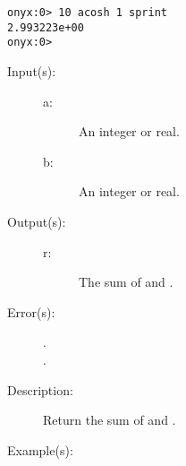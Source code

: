 \begin{description}
\begin{description}
\begin{verbatim}
onyx:0> 10 acosh 1 sprint
2.993223e+00
onyx:0>
		\end{verbatim}
	\end{description}
\label{systemdict:add}
\item[{\onyxop{a b}{add}{r}}: ]
	\begin{description}\item[]
	\item[Input(s): ]
		\begin{description}\item[]
		\item[a: ]
			An integer or real.
		\item[b: ]
			An integer or real.
		\end{description}
	\item[Output(s): ]
		\begin{description}\item[]
		\item[r: ]
			The sum of  and .
		\end{description}
	\item[Error(s): ]
		\begin{description}\item[]
		\item[.]
		\item[.]
		\end{description}
	\item[Description: ]
		Return the sum of  and .
	\item[Example(s): ]\begin{verbatim}


\end{verbatim}
\end{description}
\end{description}
